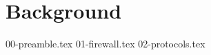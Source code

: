 \chapter{Background}
\label{background:chapter}

{00-preamble.tex}
{01-firewall.tex}
{02-protocols.tex}

